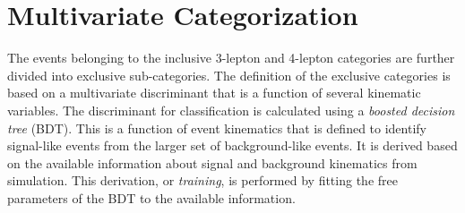 \section{Multivariate Categorization}\label{sec:hmmBdt}

The events belonging to the inclusive 3-lepton and 4-lepton categories are further divided into exclusive sub-categories.
The definition of the exclusive categories is based on a multivariate discriminant that is a function of several kinematic variables.
The discriminant for classification is calculated using a \emph{boosted decision tree} (BDT).
This is a function of event kinematics that is defined to identify signal-like events from the larger set of background-like events.
It is derived based on the available information about signal and background kinematics from simulation.
This derivation, or \emph{training}, is performed by fitting the free parameters of the BDT to the available information.

